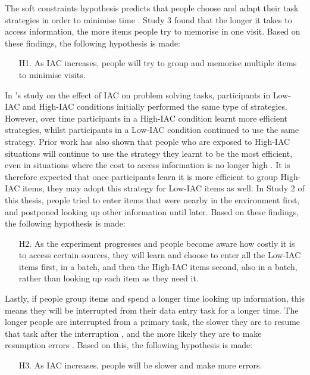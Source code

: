 \begin{table}
\begin{itemize}
The soft constraints hypothesis predicts that people choose and adapt their task strategies in order to minimise time \citep{Gray2006}. Study 3 found that the longer it takes to access information, the more items people try to memorise in one visit. Based on these findings, the following hypothesis is made: 
\begin{itemize}
\item[H1.]
As IAC increases, people will try to group and memorise multiple items to minimise visits.
\end{itemize}

In \citet{OHara1998}'s study on the effect of IAC on problem solving tasks, participants in Low-IAC and High-IAC conditions initially performed the same type of strategies. However, over time participants in a High-IAC condition  learnt more efficient strategies, whilst participants in a Low-IAC condition continued to use the same strategy. Prior work has also shown that people who are exposed to High-IAC situations will continue to use the strategy they learnt to be the most efficient, even in situations where the cost to access information is no longer high \citep{Patrick2014}. It is therefore expected that once participants learn it is more efficient to group High-IAC items, they may adopt this strategy for Low-IAC items as well. In Study 2 of this thesis, people tried to enter items that were nearby in the environment first, and postponed looking up other information until later. Based on these findings, the following hypothesis is made: 
\begin{itemize}
\item [H2.]
As the experiment progresses and people become aware how costly it is to access certain sources, they will learn and choose to enter all the Low-IAC items first, in a batch, and then the High-IAC items second, also in a batch, rather than looking up each item as they need it. 
\end{itemize}

Lastly, if people group items and spend a longer time looking up information, this means they will be interrupted from their data entry task for a longer time. The longer people are interrupted from a primary task, the slower they are to resume that task after the interruption \citep{Monk2008}, and the more likely they are to make resumption errors  \citep[e.g.][]{Brumby2013}. Based on this, the following hypothesis is made:
\begin{itemize}
\item[H3.]
As IAC increases, people will be slower and make more errors.
\end{itemize}


\end{itemize}
\end{table}
